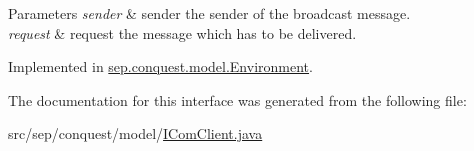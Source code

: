 \begin{DoxyParams}{Parameters}
{\em sender} & sender the sender of the broadcast message. \\
\hline
{\em request} & request the message which has to be delivered. \\
\hline
\end{DoxyParams}


Implemented in \hyperlink{classsep_1_1conquest_1_1model_1_1_environment_a880d910664e5f747ab13e0701a8d2699}{sep.conquest.model.Environment}.



The documentation for this interface was generated from the following file:\begin{DoxyCompactItemize}
\item 
src/sep/conquest/model/\hyperlink{_i_com_client_8java}{IComClient.java}\end{DoxyCompactItemize}
